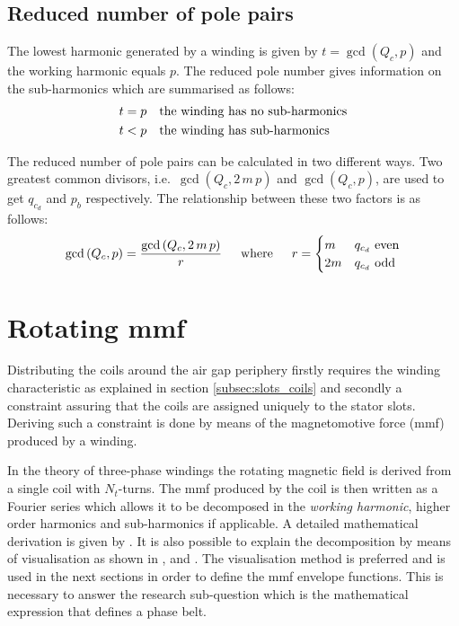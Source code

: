 \subsection{Reduced number of pole pairs}
The lowest harmonic generated by a winding is given by $t=\gcd\left(Q_c,p\right)$ and the working harmonic equals $p$. The reduced pole number gives information on the sub-harmonics which are summarised as follows:
\begin{equation}  
 \begin{aligned}
  t &= p \quad \textnormal{the winding has no sub-harmonics} \\
  t &< p \quad \textnormal{the winding has sub-harmonics}
  \end{aligned}
\end{equation} 

The reduced number of pole pairs can be calculated in two different ways. Two greatest common divisors, i.e.~$\gcd\left(Q_c,2\,m\,p\right)$ and $\gcd\left(Q_c,p\right)$, are used to get $q_{c_d}$ and $p_b$ respectively. The relationship between these two factors is as follows:
\begin{equation}
  \label{eqn:reduced_p} 
  \gcd\left(Q_c,p\right)=\frac{\gcd\left(Q_c,2\,m\,p\right)}{r} \hspace{15pt}
  \textnormal{where} \hspace{15pt} r=
  \begin{cases}
   m  & \text{$q_{c_d}$ even}\\
   2m & \text{$q_{c_d}$ odd}
  \end{cases}
\end{equation}

\section{Rotating mmf}
Distributing the coils around the air gap periphery firstly requires the winding characteristic as explained in section \ref{subsec:slots_coils} and secondly a constraint assuring that the coils are assigned uniquely to the stator slots. Deriving such a constraint is done by means of the magnetomotive force (mmf) produced by a winding. 

In the theory of three-phase windings the rotating magnetic field is derived from a single coil with $N_t$-turns. The mmf produced by the coil is then written as a Fourier series which allows it to be decomposed in the \textit{working harmonic}, higher order harmonics and sub-harmonics if applicable. A detailed mathematical derivation is given by \cite{REF-01043}. It is also possible to explain the decomposition by means of visualisation as shown in \cite{REF-00004}, \cite{REF-00294} and  \cite{REF-00330}. The visualisation method is preferred and is used in the next sections in order to define the mmf envelope functions. This is necessary to answer the research sub-question which is the mathematical expression that defines a phase belt.

